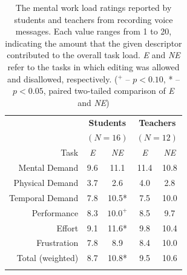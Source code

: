 \begin{table}
	\centering
	\begin{tabular}{r c c c c}
		& \multicolumn{2}{c}{\textbf{Students}} & \multicolumn{2}{c}{\textbf{Teachers}}\\
		& \multicolumn{2}{c}{$(N=16)$} & \multicolumn{2}{c}{$(N=12)$}\\
		\toprule
		Task			& \textit{E} & \textit{NE} & \textit{E} & \textit{NE}\\
		Mental Demand   & 9.6 & 11.1  & 11.4 & 10.8 \\
		Physical Demand & 3.7 & 2.6   & 4.0  & 2.8  \\
		Temporal Demand & 7.8 & 10.5*  & 7.5  & 10.0 \\
		Performance     & 8.3 & $10.0^+$  & 8.5  & 9.7  \\
		Effort          & 9.1 & 11.6*  & 9.8  & 10.4 \\
		Frustration     & 7.8 & 8.9   & 8.4  & 10.0 \\
		\midrule
		Total (weighted)& 8.7 & 10.8* & 9.5  & 10.6 \\
		\bottomrule \\
	\end{tabular}
	\caption{The mental work load ratings reported by students and teachers from recording voice messages. Each value ranges from 1 to 20, indicating the amount that the given descriptor contributed to the overall task load. \textit{E} and \textit{NE} refer to the tasks in which editing was allowed and disallowed, respectively. ($^+$ -- $p<0.10$, * -- $p<0.05$, paired two-tailed comparison of \textit{E} and \textit{NE})}~\label{tab:table1}
\end{table}

